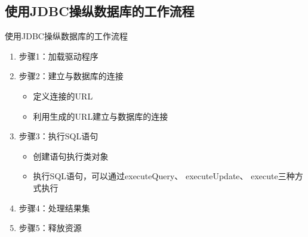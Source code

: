\subsection{使用JDBC操纵数据库的工作流程}
\begin{frame}{使用JDBC操纵数据库的工作流程}
\begin{enumerate}
    \item 步骤1：加载驱动程序
    \item 步骤2：建立与数据库的连接
    \begin{itemize}
        \item 定义连接的URL
        \item 利用生成的URL建立与数据库的连接
    \end{itemize}
    \item 步骤3：执行SQL语句
    \begin{itemize}
        \item 创建语句执行类对象
        \item 执行SQL语句，可以通过executeQuery、 executeUpdate、 execute三种方式执行
    \end{itemize}
    \item 步骤4：处理结果集
    \item 步骤5：释放资源
\end{enumerate}
\end{frame}


